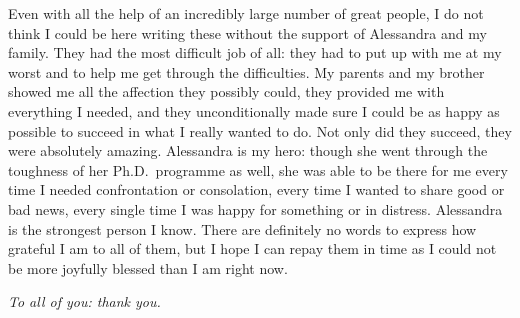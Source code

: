 Even with all the help of an incredibly large number of great people, I do not think I could be here writing these without the support of Alessandra and my family.
They had the most difficult job of all: they had to put up with me at my worst and to help me get through the difficulties.
My parents and my brother showed me all the affection they possibly could, they provided me with everything I needed, and they unconditionally made sure I could be as happy as possible to succeed in what I really wanted to do.
Not only did they succeed, they were absolutely amazing.
Alessandra is my hero: though she went through the toughness of her Ph.D.\ programme as well, she was able to be there for me every time I needed confrontation or consolation, every time I wanted to share good or bad news, every single time I was happy for something or in distress.
Alessandra is the strongest person I know.
There are definitely no words to express how grateful I am to all of them, but I hope I can repay them in time as I could not be more joyfully blessed than I am right now.

\noindent\emph{To all of you: thank you.}


